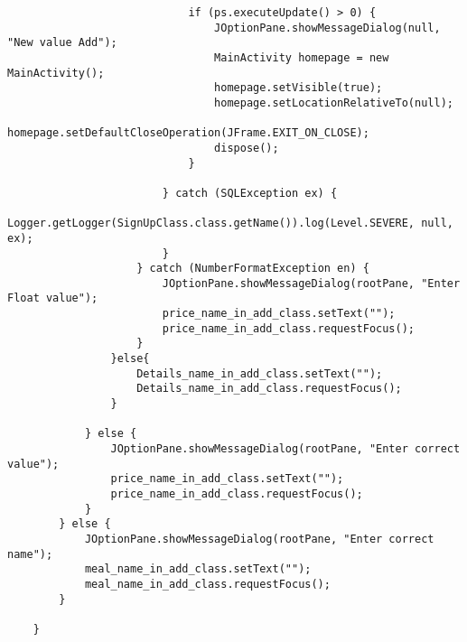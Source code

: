 \documentclass[12pt,a4paper]{article}
\begin{document}
\begin{lstlisting}
                            if (ps.executeUpdate() > 0) {
                                JOptionPane.showMessageDialog(null, "New value Add");
                                MainActivity homepage = new MainActivity();
                                homepage.setVisible(true);
                                homepage.setLocationRelativeTo(null);
                                homepage.setDefaultCloseOperation(JFrame.EXIT_ON_CLOSE);
                                dispose();
                            }

                        } catch (SQLException ex) {
                            Logger.getLogger(SignUpClass.class.getName()).log(Level.SEVERE, null, ex);
                        }
                    } catch (NumberFormatException en) {
                        JOptionPane.showMessageDialog(rootPane, "Enter Float value");
                        price_name_in_add_class.setText("");
                        price_name_in_add_class.requestFocus();
                    }
                }else{
                    Details_name_in_add_class.setText("");
                    Details_name_in_add_class.requestFocus();
                }

            } else {
                JOptionPane.showMessageDialog(rootPane, "Enter correct value");
                price_name_in_add_class.setText("");
                price_name_in_add_class.requestFocus();
            }
        } else {
            JOptionPane.showMessageDialog(rootPane, "Enter correct name");
            meal_name_in_add_class.setText("");
            meal_name_in_add_class.requestFocus();
        }

    }                                                      


\end{lstlisting}
\end{document}
